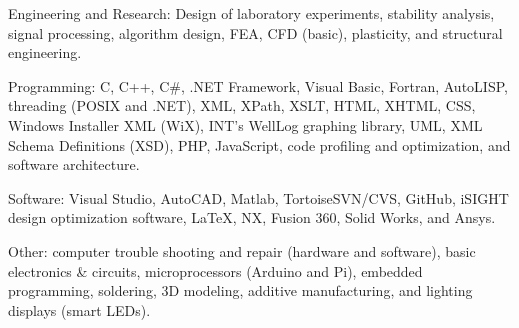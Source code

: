 \documentclass{resume}
\begin{document}
    \begin{bulletedlist}
		
		\item Engineering and Research: Design of laboratory experiments,
                        stability analysis,
                        signal processing,
                        algorithm design,
                        FEA,
                        CFD (basic),
                        plasticity,
                        and structural engineering.
                        
		\item Programming: C,
                        C++,
                        C\#,
                        .NET Framework,
                        Visual Basic,
                        Fortran,
                        AutoLISP,
                        threading (POSIX and .NET),
                        XML,
                        XPath,
                        XSLT,
                        HTML,
                        XHTML,
                        CSS,
                        Windows Installer XML (WiX),
                        INT's WellLog graphing library,
                        UML,
                        XML Schema Definitions (XSD),
                        PHP,
                        JavaScript,
                        code profiling and optimization,
                        and software architecture.
                        
		\item Software: Visual Studio,
                        AutoCAD,
                        Matlab,
                        TortoiseSVN/CVS,
                        GitHub,
                        iSIGHT design optimization software,
                        LaTeX,
                        NX,
                        Fusion 360,
                        Solid Works,
                        and Ansys.
                        
		\item Other: computer trouble shooting and repair (hardware and software),
                        basic electronics \& circuits,
                        microprocessors (Arduino and Pi),
                        embedded programming,
                        soldering,
                        3D modeling,
                        additive manufacturing,
                        and lighting displays (smart LEDs).
                        
	\end{bulletedlist}
	

    
\end{document}
